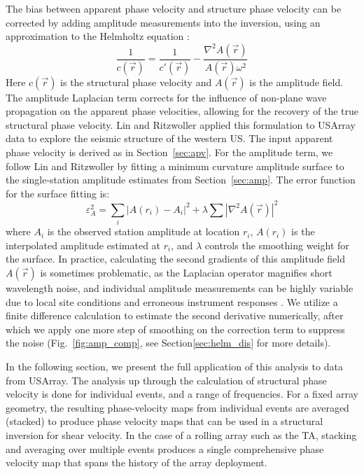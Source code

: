 \documentclass[referee]{gji}
\begin{document}
The bias between apparent phase velocity and structure phase velocity can be corrected by adding amplitude measurements into the inversion, using an approximation to the Helmholtz equation \cite{Wielandt:1993ws,Lin:2011fw}:
\[
\frac{1}{c(\vec{r})} = \frac{1}{c'(\vec{r})} - 
\frac{ \nabla^2 A(\vec{r})}{A(\vec{r}) \omega^2}
\]
Here $c(\vec{r})$ is the structural phase velocity and $A(\vec{r})$ is the amplitude field. The amplitude Laplacian term corrects for the influence of non-plane wave propagation on the apparent phase velocities, allowing for the recovery of the true structural phase velocity. Lin and Ritzwoller  applied this formulation to USArray data to explore the seismic structure of the western US.
The input apparent phase velocity is derived as in Section~\ref{sec:apv}.  For the amplitude term, we follow Lin and Ritzwoller  by fitting a minimum curvature amplitude surface to the single-station amplitude estimates from Section~\ref{sec:amp}. The error function for the surface fitting is:
\[
\varepsilon_{A}^2 = \sum_i\left|A(r_i)-A_i\right|^2 + \lambda\sum |\nabla^2 A(\vec{r})|^2 
\]
where $A_i$ is the observed station amplitude at location $r_i$, $A(r_i)$ is the interpolated amplitude estimated at $r_i$, and $\lambda$ controls the smoothing weight for the surface. In practice, calculating the second gradients of this amplitude field $A(\vec{r})$ is sometimes problematic, as the Laplacian operator magnifies short wavelength noise, and individual amplitude measurements can be highly variable due to local site conditions and erroneous instrument responses \cite{Lin:2012la,Eddy:2013la}. We utilize a finite difference calculation to estimate the second derivative numerically, after which we apply one more step of smoothing on the correction term to suppress the noise (Fig.~\ref{fig:amp_comp}, see Section\ref{sec:helm_dis} for more details).

In the following section, we present the full application of this analysis to data from USArray. The analysis up through the calculation of structural phase velocity is done for individual events, and a range of frequencies.  For a fixed array geometry, the resulting phase-velocity maps from individual events are averaged (stacked) to produce phase velocity maps that can be used in a structural inversion for shear velocity.  In the case of a rolling array such as the TA, stacking and averaging over multiple events produces a single comprehensive phase velocity map that spans the history of the array deployment.   
\end{document}
